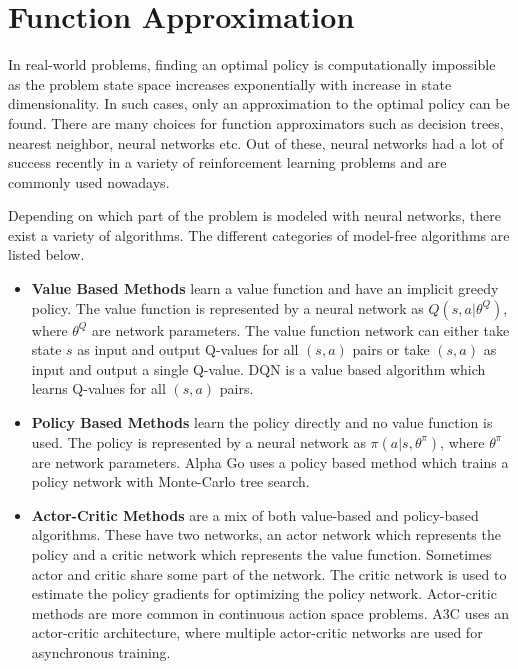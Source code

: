 \section{Function Approximation}
In real-world problems, finding an optimal policy is computationally impossible as the problem state space increases exponentially with increase in state dimensionality. In such cases, only an approximation to the optimal policy can be found. There are many choices for function approximators such as decision trees, nearest neighbor, neural networks etc. Out of these, neural networks had a lot of success recently in a variety of reinforcement learning problems and are commonly used nowadays.

Depending on which part of the problem is modeled with neural networks, there exist a variety of algorithms. The different categories of model-free algorithms are listed below.

\begin{itemize}
\item \textbf{Value Based Methods} learn a value function and have an implicit greedy policy. The value function is represented by a neural network as $Q(s,a|\theta^Q)$, where $\theta^Q$ are network parameters. The value function network can either take state $s$ as input and output Q-values for all $(s,a)$ pairs or take $(s,a)$ as input and output a single Q-value. DQN \cite{01_dqn} is a value based algorithm which learns Q-values for all $(s,a)$ pairs.

\item \textbf{Policy Based Methods} learn the policy directly and no value function is used. The policy is represented by a neural network as $\pi(a|s,\theta^\pi)$, where $\theta^\pi$ are network parameters. Alpha Go \cite{Silver_2016} uses a policy based method which trains a policy network with Monte-Carlo tree search. 

\item \textbf{Actor-Critic Methods} are a mix of both value-based and policy-based algorithms. These have two networks, an actor network which represents the policy and a critic network which represents the value function. Sometimes actor and critic share some part of the network. The critic network is used to estimate the policy gradients for optimizing the policy network. Actor-critic methods are more common in continuous action space problems. A3C \cite{a3c} uses an actor-critic architecture, where multiple actor-critic networks are used for asynchronous training.

\end{itemize}

